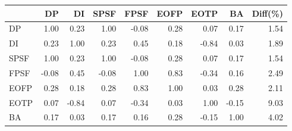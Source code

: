 \begin{tabular}{l|rrrrrrr|r}
\toprule
 & DP & DI & SPSF & FPSF & EOFP & EOTP & BA & Diff(\%)  \\
\midrule
DP & 1.00 & 0.23 & 1.00 & -0.08 & 0.28 & 0.07 & 0.17 & 1.54  \\
DI & 0.23 & 1.00 & 0.23 & 0.45 & 0.18 & -0.84 & 0.03 & 1.89  \\
SPSF & 1.00 & 0.23 & 1.00 & -0.08 & 0.28 & 0.07 & 0.17 & 1.54  \\
FPSF & -0.08 & 0.45 & -0.08 & 1.00 & 0.83 & -0.34 & 0.16 & 2.49  \\
EOFP & 0.28 & 0.18 & 0.28 & 0.83 & 1.00 & 0.03 & 0.28 & 2.11  \\
EOTP & 0.07 & -0.84 & 0.07 & -0.34 & 0.03 & 1.00 & -0.15 & 9.03  \\
BA & 0.17 & 0.03 & 0.17 & 0.16 & 0.28 & -0.15 & 1.00 & 4.02  \\
\bottomrule
\end{tabular}

